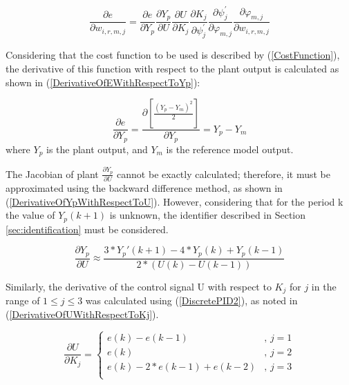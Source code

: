 \documentclass{ieeeaccess}
\begin{document}
\begin{equation}\label{DerivativeOfEWithRespectToWForTuning}
\frac{\partial e}{\partial w_{i,r,m,j}}=\frac{\partial e}{\partial Y_p}\frac{\partial Y_p}{\partial U}\frac{\partial U}{\partial K_j}\frac{\partial K_j}{\partial\psi_j^\prime}\frac{\partial\psi_j^\prime}{\partial\varphi_{m,j}}\frac{\partial\varphi_{m,j}}{\partial w_{i,r,m,j}}
\end{equation}

Considering that the cost function to be used is described by (\ref{CostFunction}), the derivative of this function with respect to the plant output is calculated as shown in (\ref{DerivativeOfEWithRespectToYp}):

\begin{equation}\label{DerivativeOfEWithRespectToYp}
\frac{\partial e}{\partial Y_p}=\frac{\partial\left[\frac{\left(Y_p-Y_m\right)^2}{2}\right]}{\partial Y_p}=Y_p-Y_m
\end{equation}
where \(Y_p\) is the plant output, and \(Y_m\) is the reference model output.

The Jacobian of plant \(\frac{\partial Y_p}{\partial U}\) cannot be exactly calculated; therefore, it must be approximated using the backward difference method, as shown in (\ref{DerivativeOfYpWithRespectToU}). However, considering that for the period k the value of \(Y_p\left(k+1\right)\) is unknown, the identifier described in Section \ref{sec:identification} must be considered.

\begin{equation}\label{DerivativeOfYpWithRespectToU}
\frac{\partial Y_p}{\partial U}\approx\frac{3\ast Y_p'\left(k+1\right)-4\ast Y_p\left(k\right)+Y_p\left(k-1\right)}{2\ast\left(U\left(k\right)-U\left(k-1\right)\right)}
\end{equation}

Similarly, the derivative of the control signal U with respect to \(K_j\) for \(j\) in the range of \(1\le j\le3\) was calculated using (\ref{DiscretePID2}), as noted in (\ref{DerivativeOfUWithRespectToKj}).

\begin{equation}\label{DerivativeOfUWithRespectToKj}
	\frac{\partial U}{\partial K_j}=
 \begin{cases}
 e\left(k\right)-e\left(k-1\right) &,\, j=1\\
 e\left(k\right) &,\, j=2\\
 e\left(k\right)-2\ast e\left(k-1\right)+e\left(k-2\right) &,\, j=3\\
 \end{cases}
\end{equation}
\end{document}
